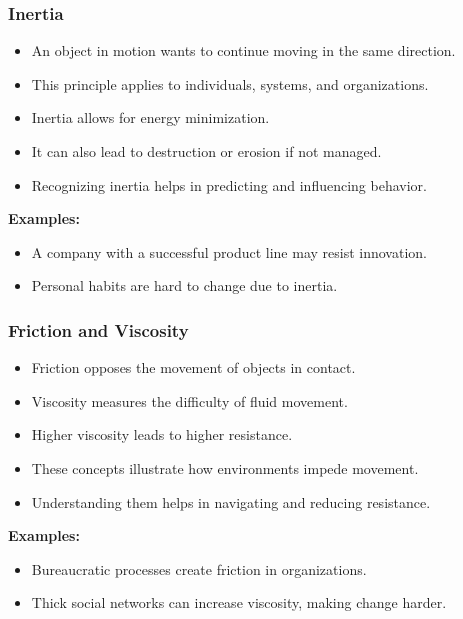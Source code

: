 \begin{frame}[fragile]\frametitle{Inertia}
\begin{itemize}
    \item An object in motion wants to continue moving in the same direction.
    \item This principle applies to individuals, systems, and organizations.
    \item Inertia allows for energy minimization.
    \item It can also lead to destruction or erosion if not managed.
    \item Recognizing inertia helps in predicting and influencing behavior.
\end{itemize}
\textbf{Examples:}
\begin{itemize}
    \item A company with a successful product line may resist innovation.
    \item Personal habits are hard to change due to inertia.
\end{itemize}
\end{frame}

\begin{frame}[fragile]\frametitle{Friction and Viscosity}
\begin{itemize}
    \item Friction opposes the movement of objects in contact.
    \item Viscosity measures the difficulty of fluid movement.
    \item Higher viscosity leads to higher resistance.
    \item These concepts illustrate how environments impede movement.
    \item Understanding them helps in navigating and reducing resistance.
\end{itemize}
\textbf{Examples:}
\begin{itemize}
    \item Bureaucratic processes create friction in organizations.
    \item Thick social networks can increase viscosity, making change harder.
\end{itemize}
\end{frame}

